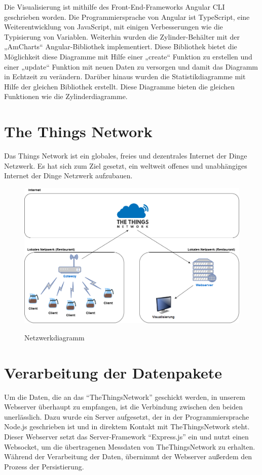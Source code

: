 \noindent
Die Visualisierung ist mithilfe des Front-End-Frameworks Angular CLI geschrieben worden. Die Programmiersprache von Angular ist TypeScript, eine Weiterentwicklung von JavaScript, mit einigen Verbesserungen wie die Typisierung von Variablen. Weiterhin wurden die Zylinder-Behälter mit der „AmCharts“ Angular-Bibliothek implementiert. Diese Bibliothek bietet die Möglichkeit diese Diagramme mit Hilfe einer „create“ Funktion zu erstellen und einer „update“ Funktion mit neuen Daten zu versorgen und damit das Diagramm in Echtzeit zu verändern. Darüber hinaus wurden die Statistikdiagramme mit Hilfe der gleichen Bibliothek erstellt. Diese Diagramme bieten die gleichen Funktionen wie die Zylinderdiagramme.

\newpage
\section{The Things Network}
Das Things Network ist ein globales, freies und dezentrales Internet der Dinge Netzwerk. Es hat sich zum Ziel gesetzt, ein weltweit offenes und unabhängiges Internet der Dinge Netzwerk aufzubauen.

\begin{figure}[H]
    \center
    \includegraphics[width=16cm]{Bilder/Netzwerkdiagramm.png}\\
    \caption{Netzwerkdiagramm}
    \label{fig:Netzwerkdiagramm}
\end{figure}

\section{Verarbeitung der Datenpakete}
Um die Daten, die an das ``TheThingsNetwork'' geschickt werden, in unserem Webserver überhaupt zu empfangen, ist die Verbindung zwischen den beiden unerlässlich. Dazu wurde ein Server aufgesetzt, der in der Programmiersprache Node.js geschrieben ist und in direktem Kontakt mit TheThingsNetwork steht. Dieser Webserver setzt das Server-Framework ``Express.js'' ein und nutzt einen Websocket, um die übertragenen Messdaten von TheThingsNetwork zu erhalten. Während der Verarbeitung der Daten, übernimmt der Webserver außerdem den Prozess der Persistierung.\\

